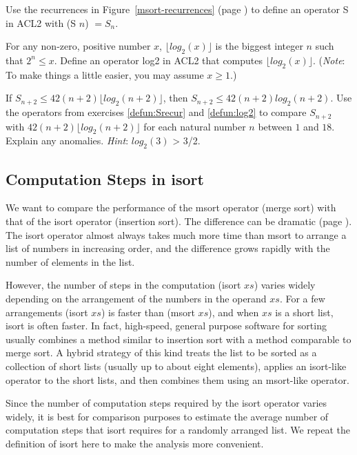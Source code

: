 \begin{ExerciseList}

\Exercise
\label{defun:Srecur}
Use the recurrences in Figure~\ref{msort-recurrences} (page \pageref{msort-recurrences})
to define an operator S in ACL2 with (S $n$) $= S_n$.

\Exercise
\label{defun:log2}
For any non-zero, positive number $x$, $\lfloor log_2(x)\rfloor$
is the biggest integer $n$ such that $2^n \leq x$.
Define an operator log2 in ACL2 that computes $\lfloor log_2(x)\rfloor$.
(\emph{Note}: To make things a little easier, you may assume $x \geq 1$.)

\Exercise
If $S_{n+2} \leq 42(n+2)\lfloor log_2(n+2)\rfloor$, then
$S_{n+2} \leq 42(n+2) log_2(n+2)$.
Use the operators from exercises \ref{defun:Srecur} and \ref{defun:log2}
to compare $S_{n+2}$ with $42(n+2)\lfloor log_2(n+2)\rfloor$
for each natural number $n$ between $1$ and $18$. Explain any anomalies.
\emph{Hint}: $log_2(3)$ > 3/2.

\end{ExerciseList}

\subsection{Computation Steps in isort}
\label{subsec:isort-steps}

We want to compare the performance of the msort operator (merge sort)
with that of the isort operator (insertion sort).
The difference can be dramatic
(page \pageref{bubble-vs-quicksort-example}).
The isort operator almost always takes much more time than msort
to arrange a list of numbers in increasing order,
and the difference grows rapidly with the number of elements in the list.

However, the number of steps in the computation (isort $xs$)
varies widely depending on the arrangement of the numbers in the operand $xs$.
For a few arrangements
(isort $xs$) is faster than (msort $xs$),
and when $xs$ is a short list, isort is often faster.
In fact, high-speed, general purpose software for sorting
usually combines a method similar to insertion sort
with a method comparable to merge sort.
A hybrid strategy of this kind treats
the list to be sorted as a collection of short lists
(usually up to about eight elements),
applies an isort-like operator to the short lists,
and then combines them
using an msort-like operator.

Since the number of computation steps required by the isort operator
varies widely, it is best for comparison purposes
to estimate the average number of computation steps that
isort requires for a randomly arranged list.
We repeat the definition of isort
here to make the analysis more convenient.

